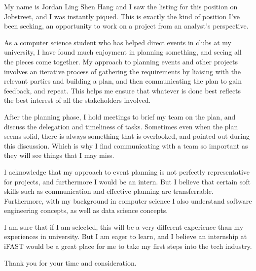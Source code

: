 

My name is Jordan Ling Shen Hang and I saw the listing for this position on Jobstreet, and I was instantly piqued. This is exactly the kind of position I've been seeking, an opportunity to work on a project from an analyst's perspective.

As a computer science student who has helped direct events in clubs at my university, I have found much enjoyment in planning something, and seeing all the pieces come together. My approach to planning events and other projects involves an iterative process of gathering the requirements by liaising with the relevant parties and building a plan, and then communicating the plan to gain feedback, and repeat. This helps me ensure that whatever is done best reflects the best interest of all the stakeholders involved. 

After the planning phase, I hold meetings to brief my team on the plan, and discuss the delegation and timeliness of tasks. Sometimes even when the plan seems solid, there is always something that is overlooked, and pointed out during this discussion. Which is why I find communicating with a team so important as they will see things that I may miss. 


I acknowledge that my approach to event planning is not perfectly representative for projects, and furthermore I would be an intern. But I believe that certain soft skills such as communication and effective planning are transferrable. Furthermore, with my background in computer science I also understand software engineering concepts, as well as data science concepts.

I am sure that if I am selected, this will be a very different experience than my experiences in university. But I am eager to learn, and I believe an internship at iFAST would be a great place for me to take my first steps into the tech industry.

Thank you for your time and consideration.




